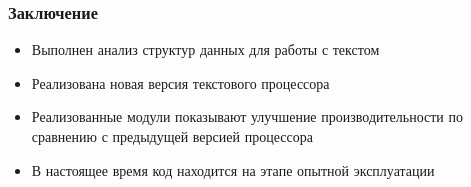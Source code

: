 \documentclass[10pt, unicode]{beamer}
\begin{document}
    \begin{frame}
        \frametitle{Заключение}
        \begin{itemize}
            \item Выполнен анализ структур данных для работы с текстом
            \item Реализована новая версия текстового процессора
            \item Реализованные модули показывают улучшение производительности по сравнению с
            предыдущей версией процессора
            \item В настоящее время код находится на этапе опытной эксплуатации
        \end{itemize}
    \end{frame}
\end{document}
